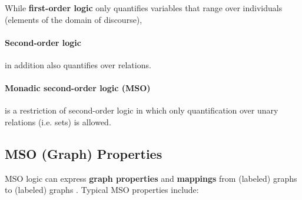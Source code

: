 \documentclass[a4paper, 12pt, bibliography=totoc]{scrartcl}
\begin{document}
While \textbf{first-order logic} only quantifies variables that range over individuals (elements of the domain of discourse), \paragraph{Second-order logic}in addition also quantifies over relations.

\paragraph{Monadic second-order logic (MSO)} is a restriction of second-order logic in which only quantification over unary relations (i.e. sets) is allowed. 


%

\subsection{MSO (Graph) Properties}
MSO logic can express \textbf{graph properties} and \textbf{mappings} from (labeled) graphs to (labeled) graphs \cite{CourcelleGROW}.
Typical MSO properties include:
\end{document}
